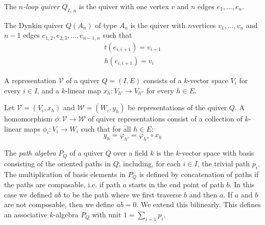 \begin{defn}
The \emph{\(n\)-loop quiver} \(Q_{L,n}\) is the quiver with one vertex \(v\) and \(n\) edges \(e_{1},\ldots ,e_{n}\).
\end{defn}

\begin{defn}
The Dynkin quiver \(Q(A_{n})\) of type \(A_{n}\) is the quiver with \(n\)vertices \(v_{1},\ldots ,v_{n}\) and \(n-1\) edges \(e_{1,2},e_{2,3},\ldots ,e_{n-1,n}\) such that
\begin{gather*}t(e_{i,i+1})=v_{i+1} \\
h(e_{i,i+1}) =v_{i}\end{gather*}

\end{defn}

\begin{defn}
A representation \(\mathcal{V}\) of a quiver \(Q=(I,E)\) consists of a \(k\)-vector space \(V_{i}\) for every \(i\in I\), and a \(k\)-linear map \(x_{h}: V_{h'}\rightarrow V_{h''}\) for every \(h\in E\).
\end{defn}


\begin{defn}
Let \(\mathcal{V}=(V_{i},x_{h})\) and \(\mathcal{W}=(W_{i},y_{h})\) be representations of the quiver \(Q\). A homomorphism \(\phi : \mathcal{V}\rightarrow \mathcal{W}\) of quiver representations consist of a collection of \(k\)-linear maps \(\phi _{i}:V_{i}\rightarrow W_{i}\) such that for all \(h\in E\):
\[y_{h}=\varphi _{h'}=\varphi _{h''} \circ  x_{h}\]

\end{defn}

\begin{defn}

The \emph{path algebra} \(P_{Q}\) of a quiver \(Q\) over a field \(k\) is the \(k\)-vector space with basis consisting of the oriented paths in \(Q\), including, for each \(i\in I\), the trivial path \(p_{i}\). The multiplication of basis elements in \(P_{Q}\) is defined by concatenation of paths if the paths are compasable, i.e. if path $a$ starts in the end point of path \(b\). In this case we defined \(ab\) to be the path where we first traverse \(b\) and then \(a\). If \(a\) and \(b\) are not composable, then we define \(ab=0\). We extend this bilinearly. This defines an associative \(k\)-algebra \(P_{Q}\) with unit $1=\sum _{i=1}p_{i}$.

\end{defn}

